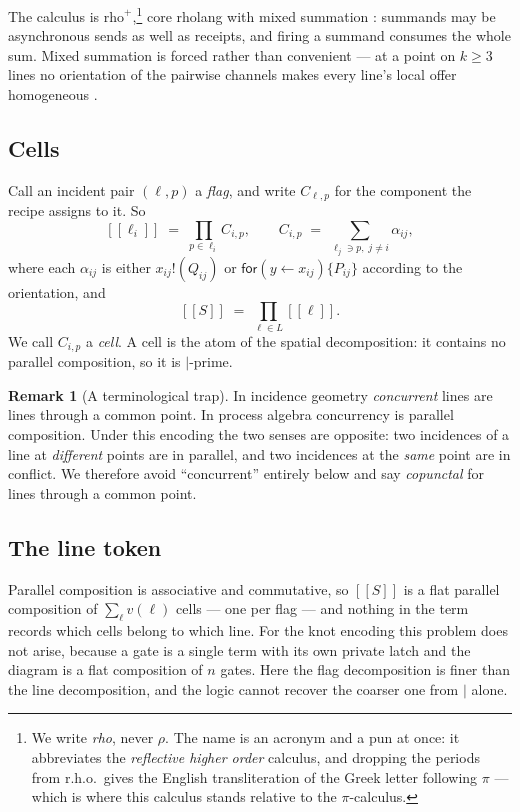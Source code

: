 \documentclass[11pt]{article}
\theoremstyle{plain}
\theoremstyle{definition}
\newtheorem{remark}[theorem]{Remark}
\newcommand{\enc}[1]{[\![#1]\!]}
\newcommand{\rhoplus}{\mathrm{rho}^{+}}
\begin{document}
The calculus is $\rhoplus$,\footnote{We write \emph{rho}, never $\rho$. The name is an acronym and a
pun at once: it abbreviates the \emph{reflective higher order} calculus, and dropping the periods
from r.h.o.\ gives the English transliteration of the Greek letter following $\pi$ --- which is
where this calculus stands relative to the $\pi$-calculus.} core rholang with mixed summation
\cite[Def.~9]{Geometry}: summands may
be asynchronous sends as well as receipts, and firing a summand consumes the whole sum. Mixed
summation is forced rather than convenient --- at a point on $k \geq 3$ lines no orientation of the
pairwise channels makes every line's local offer homogeneous \cite[Prop.~7]{Geometry}.

\subsection{Cells}

Call an incident pair $(\ell,p)$ a \emph{flag}, and write $C_{\ell,p}$ for the component the recipe
assigns to it. So
\[
\enc{\ell_i} \;=\; \prod_{p \in \ell_i} C_{i,p},
\qquad
C_{i,p} \;=\; \sum_{\ell_j \ni p,\; j \neq i} \alpha_{ij},
\]
where each $\alpha_{ij}$ is either $x_{ij}!(Q_{ij})$ or $\mathsf{for}(y \leftarrow x_{ij})\{P_{ij}\}$
according to the orientation, and
\[
\enc{S} \;=\; \prod_{\ell \in L} \enc{\ell}.
\]
We call $C_{i,p}$ a \emph{cell}. A cell is the atom of the spatial decomposition: it contains no
parallel composition, so it is $|$-prime.

\begin{remark}[A terminological trap]
In incidence geometry \emph{concurrent} lines are lines through a common point. In process algebra
concurrency is parallel composition. Under this encoding the two senses are opposite: two
incidences of a line at \emph{different} points are in parallel, and two incidences at the
\emph{same} point are in conflict. We therefore avoid ``concurrent'' entirely below and say
\emph{copunctal} for lines through a common point.
\end{remark}

\subsection{The line token}
\label{sec:token}

Parallel composition is associative and commutative, so $\enc{S}$ is a flat parallel composition of
$\sum_{\ell} v(\ell)$ cells --- one per flag --- and nothing in the term records which cells belong
to which line. For the knot encoding this problem does not arise, because a gate is a single term
with its own private latch and the diagram is a flat composition of $n$ gates. Here the flag
decomposition is finer than the line decomposition, and the logic cannot recover the coarser one
from $|$ alone.
\end{document}
